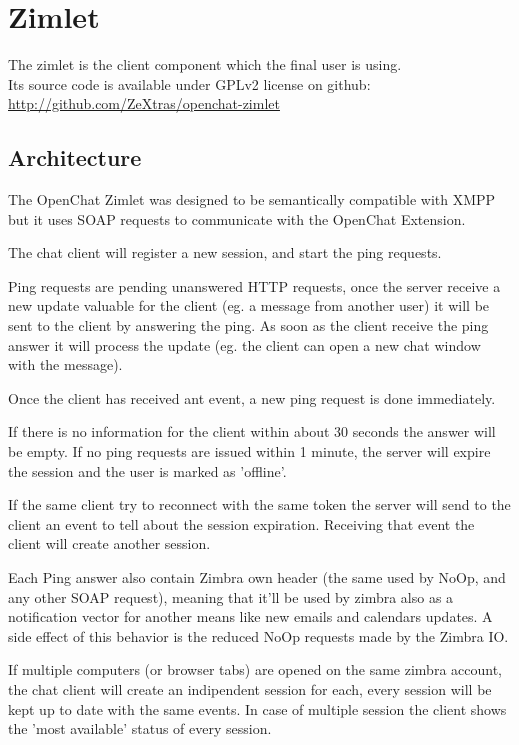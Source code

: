 \section{Zimlet}
The zimlet is the client component which the final user is using.\\
Its source code is available under GPLv2 license on github: \url{http://github.com/ZeXtras/openchat-zimlet}

\ifdefined\INTERNALDOC %
\subsection{Architecture}
The OpenChat Zimlet was designed to be semantically compatible with XMPP but it uses SOAP requests to communicate with
 the OpenChat Extension.

The chat client will register a new session, and start the ping requests.

Ping requests are pending unanswered HTTP requests, once the server receive a new update valuable for the client (eg.
 a message from another user) it will be sent to the client by answering the ping. As soon as the client receive
 the ping answer it will process the update (eg. the client can open a new chat window with the message).

Once the client has received ant event, a new ping request is done immediately.

If there is no information for the client within  about 30 seconds the answer will be empty. If no ping requests are issued
 within 1 minute, the server will expire the session and the user is marked as 'offline'.

If the same client try to reconnect with the same token the server will send to the client an event to tell about the session
 expiration. Receiving that event the client will create another session.

Each Ping answer also contain Zimbra own header (the same used by NoOp, and any other SOAP request), meaning that it'll
 be used by zimbra also as a notification vector for another means like new emails and calendars updates.
 A side effect of this behavior is the reduced NoOp requests made by the Zimbra IO.

If multiple computers (or browser tabs) are opened on the same zimbra account, the chat client will create an indipendent
 session for each, every session will be kept up to date with the same events. In case of multiple session
 the client shows the 'most available' status of every session.

